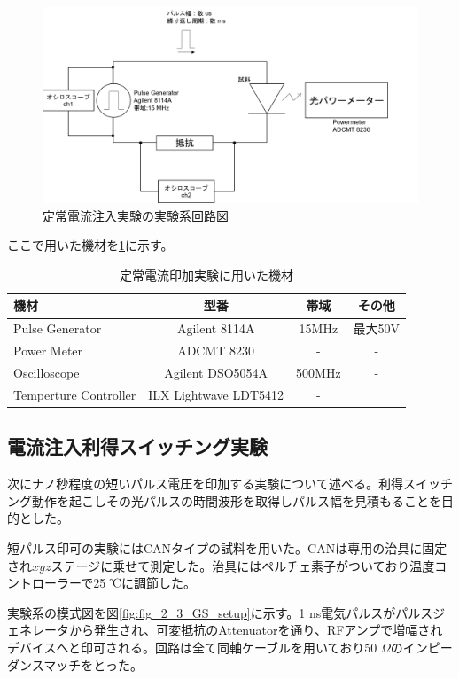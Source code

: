 \begin{figure}[htbp]
	\includegraphics[width=15cm]{figure/fig_2_2_IL_setup.png}
	\caption{定常電流注入実験の実験系回路図}
	\label{fig:fig_2_2_IL_setup}
\end{figure}
\clearpage
ここで用いた機材を\ref{table:table_2_2_IL_setup}に示す。
\begin{table}[h]
  \caption{定常電流印加実験に用いた機材}
    \label{table:table_2_2_IL_setup}
  \centering
  \begin{tabular}{lccc}
    \hline
    機材  & 型番 &帯域  & その他  \\
    \hline \hline
    Pulse Generator  & Agilent 8114A & 15MHz &最大50V \\
    Power Meter  &  ADCMT 8230 & -&-  \\
    Oscilloscope  &  Agilent DSO5054A &500MHz&- \\
    Temperture Controller & ILX Lightwave  LDT5412&-\\
       \hline
  \end{tabular}
\end{table}
\subsection{電流注入利得スイッチング実験}%
次にナノ秒程度の短いパルス電圧を印加する実験について述べる。利得スイッチング動作を起こしその光パルスの時間波形を取得しパルス幅を見積もることを目的とした。

短パルス印可の実験にはCANタイプの試料を用いた。CANは専用の治具に固定され$xyz$ステージに乗せて測定した。治具にはペルチェ素子がついており温度コントローラーで25 ℃に調節した。


実験系の模式図を図\ref{fig:fig_2_3_GS_setup}に示す。1 ns電気パルスがパルスジェネレータから発生され、可変抵抗のAttenuatorを通り、RFアンプで増幅されデバイスへと印可される。回路は全て同軸ケーブルを用いており50 $\Omega$のインピーダンスマッチをとった。

